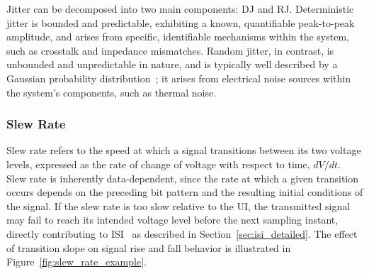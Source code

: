 Jitter can be decomposed into two main components: \ac{DJ} and \ac{RJ}. Deterministic jitter is bounded and predictable, exhibiting a known, quantifiable peak-to-peak amplitude, and arises from specific, identifiable mechanisms within the system, such as crosstalk and impedance mismatches. Random jitter, in contrast, is unbounded and unpredictable in nature, and is typically well described by a Gaussian probability distribution~\cite{baker_mixed_signal}; it arises from electrical noise sources within the system's components, such as thermal noise.

\subsubsection{Slew Rate}\label{sec:slew_rate}

Slew rate refers to the speed at which a signal transitions between its two voltage levels, expressed as the rate of change of voltage with respect to time, $dV/dt$. Slew rate is inherently data-dependent, since the rate at which a given transition occurs depends on the preceding bit pattern and the resulting initial conditions of the signal. If the slew rate is too slow relative to the \ac{UI}, the transmitted signal may fail to reach its intended voltage level before the next sampling instant, directly contributing to \ac{ISI}~\cite{razavi_NRZ_PAM4} as described in Section~\ref{sec:isi_detailed}.
The effect of transition slope on signal rise and fall behavior is illustrated in Figure~\ref{fig:slew_rate_example}.

